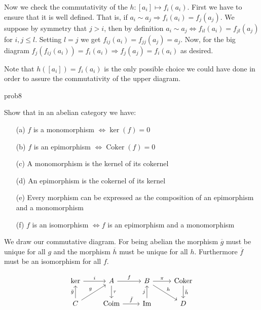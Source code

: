 \documentclass[leqno]{article}
\DeclareMathOperator{\coker}{Coker}
\begin{document}
Now we check the commutativity of the $h: [a_i] \mapsto f_i(a_i)$. First we have to ensure that it is well defined. That is, if $a_i\sim  a_j \Rightarrow f_i(a_i)=f_j(a_j)$. We suppose by symmetry that  $j>i$, then  by definition $a_i\sim a_j \iff f_{il}(a_i)=f_{jl}(a_j)$ for $i, j\le l$. Setting $l = j$ we get  $f_{ij}(a_i)=f_{jj}(a_j)=a_j$. Now, for the big diagram $f_j(f_{ij}(a_i))=f_i(a_i) \Rightarrow f_j(a_j)= f_i(a_i)$ as desired. 

Note that $h([a_i])=f_i(a_i)$ is the only possible choice we could have done in order to assure the commutativity of the upper diagram.




prob{8}{Show that in an abelian category we have:
  \begin{enumerate}[topsep=-6pt, itemsep=0pt]
	\item[(a)] $f$ is a monomorphism  $\iff \ker(f)=0$ 
	\item[(b)] $f$ is an epimorphism $\iff \coker(f)=0$ 
	\item[(c)] A monomorphism is the kernel of its cokernel
	\item[(d)] An epimorphism is the cokernel of its kernel
	\item[(e)] Every morphism can be expressed as the composition of an epimorphism and a monomorphism
	\item[(f)] $f$ is an isomorphism  $\iff f$ is an epimorphism and a monomorphism
  \end{enumerate}
  \vspace{1em}
}
We draw our commutative diagram. For being abelian the morphism $\overline{g}$ must be unique for all $g$ and the morphism $\overline{h}$ must be unique for all $h$. Furthermore $\overline{f}$ must be an isomorphism for all  $f$.

\[\begin{tikzcd}
	{\text{ker}} & A & B & {\text{Coker}} \\
	C & {\text{Coim}} & {\text{Im}} & D
	\arrow["i", from=1-1, to=1-2]
	\arrow["f", from=1-2, to=1-3]
	\arrow["\pi", from=1-3, to=1-4]
	\arrow["j", from=2-3, to=1-3]
	\arrow["\tau", from=1-2, to=2-2]
	\arrow["{\bar{f}}", from=2-2, to=2-3]
	\arrow["g", from=2-1, to=1-2]
	\arrow["{\bar{g}}", from=2-1, to=1-1]
	\arrow["h", from=1-3, to=2-4]
	\arrow["{\bar{h}}", from=1-4, to=2-4]
\end{tikzcd}\]
\end{document}
